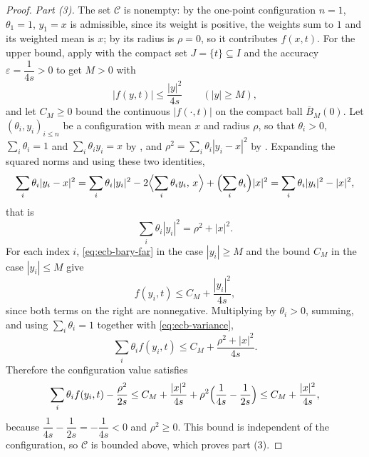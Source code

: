 \begin{proof}
\emph{Part (3).} The set $\mathcal C$ is nonempty: by  the
one-point configuration $n=1$, $\theta_1=1$, $y_1=x$ is admissible, since its
weight is positive, the weights sum to $1$ and its weighted mean is $x$; by
 its radius is $\rho=0$, so it contributes $f(x,t)$. For the
upper bound, apply  with the compact set
$J=\{t\}\subseteq I$ and the accuracy $\varepsilon=\dfrac{1}{4s}>0$ to get
$M>0$ with
\begin{equation}\label{eq:ecb-bary-far}
  |f(y,t)|\le\frac{|y|^2}{4s}\qquad(|y|\ge M),
\end{equation}
and let $C_M\ge0$ bound the continuous $|f(\cdot,t)|$ on the compact ball
$\overline B_M(0)$. Let $(\theta_i,y_i)_{i\le n}$ be a configuration with mean
$x$ and radius $\rho$, so that $\theta_i>0$, $\sum_i\theta_i=1$ and
$\sum_i\theta_iy_i=x$ by , and
$\rho^2=\sum_i\theta_i|y_i-x|^2$ by . Expanding the squared
norms and using these two identities,
\[
  \sum_i\theta_i|y_i-x|^2
   =\sum_i\theta_i|y_i|^2
      -2\Bigl\langle\sum_i\theta_iy_i,\,x\Bigr\rangle
      +\Bigl(\sum_i\theta_i\Bigr)|x|^2
   =\sum_i\theta_i|y_i|^2-|x|^2,
\]
that is
\begin{equation}\label{eq:ecb-variance}
  \sum_i\theta_i|y_i|^2=\rho^2+|x|^2 .
\end{equation}
For each index $i$, \eqref{eq:ecb-bary-far} in the case $|y_i|\ge M$ and the
bound $C_M$ in the case $|y_i|\le M$ give
\[
  f(y_i,t)\le C_M+\frac{|y_i|^2}{4s},
\]
since both terms on the right are nonnegative. Multiplying by $\theta_i>0$,
summing, and using $\sum_i\theta_i=1$ together with \eqref{eq:ecb-variance},
\[
  \sum_i\theta_if(y_i,t)\le C_M+\frac{\rho^2+|x|^2}{4s}.
\]
Therefore the configuration value satisfies
\[
  \sum_i\theta_if(y_i,t)-\frac{\rho^2}{2s}
   \le C_M+\frac{|x|^2}{4s}+\rho^2\Bigl(\frac{1}{4s}-\frac{1}{2s}\Bigr)
   \le C_M+\frac{|x|^2}{4s},
\]
because $\dfrac1{4s}-\dfrac1{2s}=-\dfrac1{4s}<0$ and $\rho^2\ge0$. This bound is
independent of the configuration, so $\mathcal C$ is bounded above, which proves
part (3).
\end{proof}
